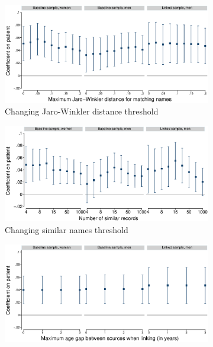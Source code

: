 \documentclass[12pt,english]{article}
\begin{document}
\begin{figure}[!ht]
\caption[Robustness of effects on single marital status]{Robustness of effects on likelihood of being enumerated as a single adult}
\centering
\begin{subfigure}{0.66\textwidth}
    \centering
    \includegraphics[width=1.0\linewidth]{../output/02_appendix/figure_a14_panel_1.eps}
    \caption{Changing Jaro-Winkler distance threshold}
    \label{fig:jw-robust-single}
\end{subfigure}
\begin{subfigure}{0.66\textwidth}
    \centering
    \includegraphics[width=1.0\linewidth]{../output/02_appendix/figure_a14_panel_2.eps}
    \caption{Changing similar names threshold}
    \label{fig:sim-records-robust-single}
\end{subfigure}
\begin{subfigure}{0.66\textwidth}
    \centering
    \includegraphics[width=1.0\linewidth]{../output/02_appendix/figure_a14_panel_3.eps}

\end{subfigure}
\end{figure}
\end{document}
